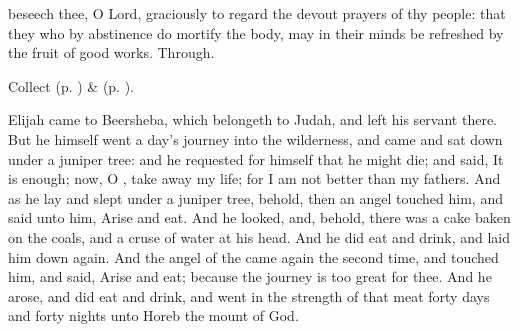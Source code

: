 {} beseech thee, O Lord, graciously to regard the devout prayers of thy people: that they who by abstinence do mortify the body, may in their minds be refreshed by the fruit of good works. Through.

\begin{rubric}
     Collect  (p. \pageref{AshWednesdayMassCollect}) \&   (p. \pageref{SPLivingDeparted}).
\end{rubric}

 Elijah came to Beersheba, which belongeth to Judah, and left his servant there. But he himself went a day's journey into the wilderness, and came and sat down under a juniper tree: and he requested for himself that he might die; and said, It is enough; now, O , take away my life; for I am not better than my fathers. And as he lay and slept under a juniper tree, behold, then an angel touched him, and said unto him, Arise and eat. And he looked, and, behold, there was a cake baken on the coals, and a cruse of water at his head. And he did eat and drink, and laid him down again. And the angel of the  came again the second time, and touched him, and said, Arise and eat; because the journey is too great for thee. And he arose, and did eat and drink, and went in the strength of that meat forty days and forty nights unto Horeb the mount of God.


\vspace{-0.25\baselineskip}

